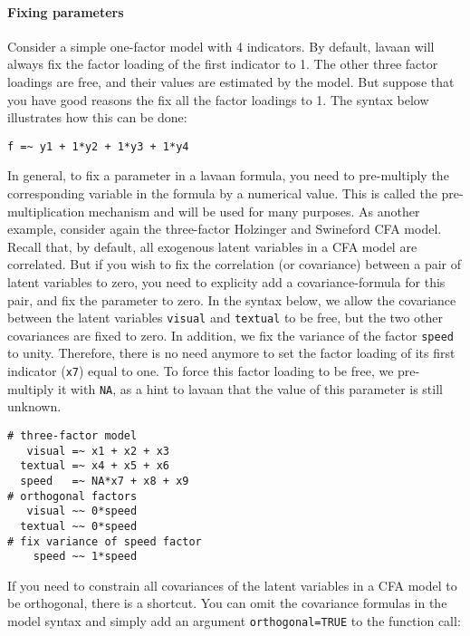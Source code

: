 \hypertarget{fixing-parameters}{%
\paragraph{Fixing parameters}\label{fixing-parameters}}

Consider a simple one-factor model with 4 indicators. By default, lavaan
will always fix the factor loading of the first indicator to 1. The
other three factor loadings are free, and their values are estimated by
the model. But suppose that you have good reasons the fix all the factor
loadings to 1. The syntax below illustrates how this can be done:

\begin{verbatim}
f =~ y1 + 1*y2 + 1*y3 + 1*y4
\end{verbatim}

In general, to fix a parameter in a lavaan formula, you need to
pre-multiply the corresponding variable in the formula by a numerical
value. This is called the pre-multiplication mechanism and will be used
for many purposes. As another example, consider again the three-factor
Holzinger and Swineford CFA model. Recall that, by default, all
exogenous latent variables in a CFA model are correlated. But if you
wish to fix the correlation (or covariance) between a pair of latent
variables to zero, you need to explicity add a covariance-formula for
this pair, and fix the parameter to zero. In the syntax below, we allow
the covariance between the latent variables \texttt{visual} and
\texttt{textual} to be free, but the two other covariances are fixed to
zero. In addition, we fix the variance of the factor \texttt{speed} to
unity. Therefore, there is no need anymore to set the factor loading of
its first indicator (\texttt{x7}) equal to one. To force this factor
loading to be free, we pre-multiply it with \texttt{NA}, as a hint to
lavaan that the value of this parameter is still unknown.

\begin{verbatim}
# three-factor model
   visual =~ x1 + x2 + x3
  textual =~ x4 + x5 + x6
  speed   =~ NA*x7 + x8 + x9
# orthogonal factors
   visual ~~ 0*speed
  textual ~~ 0*speed
# fix variance of speed factor
    speed ~~ 1*speed
\end{verbatim}

If you need to constrain all covariances of the latent variables in a
CFA model to be orthogonal, there is a shortcut. You can omit the
covariance formulas in the model syntax and simply add an argument
\texttt{orthogonal=TRUE} to the function call:

